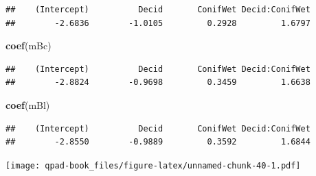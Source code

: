 \documentclass[12pt,]{book}
\newenvironment{Shaded}{\begin{snugshade}}{\end{snugshade}}
\newcommand{\DataTypeTok}[1]{\textcolor[rgb]{0.13,0.29,0.53}{#1}}
\newcommand{\DecValTok}[1]{\textcolor[rgb]{0.00,0.00,0.81}{#1}}
\newcommand{\KeywordTok}[1]{\textcolor[rgb]{0.13,0.29,0.53}{\textbf{#1}}}
\newcommand{\NormalTok}[1]{#1}
\newcommand{\OperatorTok}[1]{\textcolor[rgb]{0.81,0.36,0.00}{\textbf{#1}}}
\newcommand{\StringTok}[1]{\textcolor[rgb]{0.31,0.60,0.02}{#1}}
\begin{document}
\begin{verbatim}
##    (Intercept)          Decid       ConifWet Decid:ConifWet 
##        -2.6836        -1.0105         0.2928         1.6797
\end{verbatim}

\begin{Shaded}
\begin{Highlighting}[]
\KeywordTok{coef}\NormalTok{(mBc)}
\end{Highlighting}
\end{Shaded}

\begin{verbatim}
##    (Intercept)          Decid       ConifWet Decid:ConifWet 
##        -2.8824        -0.9698         0.3459         1.6638
\end{verbatim}

\begin{Shaded}
\begin{Highlighting}[]
\KeywordTok{coef}\NormalTok{(mBl)}
\end{Highlighting}
\end{Shaded}

\begin{verbatim}
##    (Intercept)          Decid       ConifWet Decid:ConifWet 
##        -2.8550        -0.9889         0.3592         1.6844
\end{verbatim}

\begin{Shaded}
\end{Shaded}

\texttt{[image: qpad-book\_files/figure-latex/unnamed-chunk-40-1.pdf]}
\end{document}
